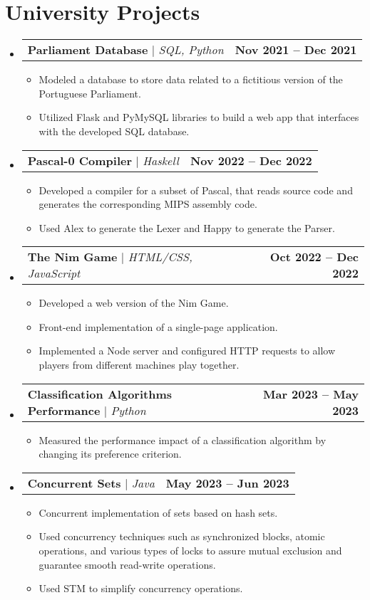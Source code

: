 \documentclass[letterpaper,11pt]{article}
\makeatletter
\newcommand{\resumeItem}[1]{
  \item\small{
    {#1 \vspace{-2pt}}
  }
}
\newcommand{\resumeProjectHeading}[2]{
    \item
    \begin{tabular*}{1.001\textwidth}{l@{\extracolsep{\fill}}r}
      \small#1 & \textbf{\small #2}\\
    \end{tabular*}\vspace{-7pt}
}
\newcommand{\resumeSubHeadingListStart}{\begin{itemize}[leftmargin=0.0in, label={}]}
\newcommand{\resumeSubHeadingListEnd}{\end{itemize}}
\newcommand{\resumeItemListStart}{\begin{itemize}}
\newcommand{\resumeItemListEnd}{\end{itemize}\vspace{-5pt}}
\makeatother
\begin{document}
\section{University Projects}
    \vspace{-5pt}
    \resumeSubHeadingListStart
      \resumeProjectHeading
          {\textbf{Parliament Database} $|$ \emph{SQL, Python}}{Nov 2021 -- Dec 2021}
          \resumeItemListStart
            \resumeItem{Modeled a database to store data related to a fictitious version of the Portuguese Parliament.}
            \resumeItem{Utilized Flask and PyMySQL libraries to build a web app that interfaces with the developed SQL database.}
          \resumeItemListEnd
          \vspace{-13pt}
          \resumeProjectHeading
          {\textbf{Pascal-0 Compiler} $|$ \emph{Haskell}}{Nov 2022 -- Dec 2022}
          \resumeItemListStart
            \resumeItem{Developed a compiler for a subset of Pascal, that reads source code and generates the corresponding MIPS assembly code.}
            \resumeItem{Used Alex to generate the Lexer and Happy to generate the Parser.}
          \resumeItemListEnd
          \vspace{-13pt}
          \resumeProjectHeading
          {\textbf{The Nim Game} $|$ \emph{HTML/CSS, JavaScript}}{Oct 2022 -- Dec 2022}
          \resumeItemListStart
            \resumeItem{Developed a web version of the Nim Game.}
            \resumeItem{Front-end implementation of a single-page application.}
            \resumeItem{Implemented a Node server and configured HTTP requests to allow players from different machines play together.}
          \resumeItemListEnd
          \vspace{-13pt}
          \resumeProjectHeading
          {\textbf{Classification Algorithms Performance} $|$ \emph{Python}}{Mar 2023 -- May 2023}
          \resumeItemListStart
            \resumeItem{Measured the performance impact of a classification algorithm by changing its preference criterion.}
          \resumeItemListEnd
          \vspace{-13pt}
          \resumeProjectHeading
          {\textbf{Concurrent Sets} $|$ \emph{Java}}{May 2023 -- Jun 2023}
          \resumeItemListStart
            \resumeItem{Concurrent implementation of sets based on hash sets.}
            \resumeItem{Used concurrency techniques such as synchronized blocks, atomic operations, and various types of locks to assure mutual exclusion and guarantee smooth read-write operations.}
            \resumeItem{Used STM to simplify concurrency operations.}
          \resumeItemListEnd 
    \resumeSubHeadingListEnd
\vspace{-15pt}
\end{document}

